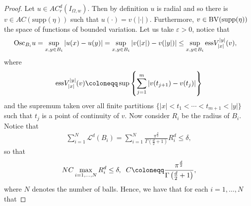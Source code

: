 \documentclass[11pt,leqno]{amsart}
\theoremstyle{remark}
\theoremstyle{definition}
\theoremstyle{definition}
\newcommand{\supp}{\mathrm{supp}}
\begin{document}
\begin{proof}
Let $u\in AC_{r}^{d}(I_{\Omega,w})$. Then by definition $u$ is radial and so there is $v\in AC({\supp(\eta)})$ such that $u(\cdot)=v(\vert \cdot\vert)$.   Furthermore, $v\in {\rm BV}({\supp(\eta)})$ the space of functions of bounded variation. Let us take $\varepsilon>0$, notice that
\begin{align}\label{mkmk}
{\rm Osc}_{B_{i}}u=\sup_{x,y\in B_{i}}\vert u(x)-u(y) \vert&=\sup_{x,y\in B_{i}}\vert v(\vert x\vert)-v(\vert y\vert) \vert
\leq \sup_{x,y\in B_{i}}{\rm ess} V_{\vert x\vert}^{\vert y\vert}(v),
\end{align}
where 
\begin{align*}
{\rm ess} V_{\vert x\vert}^{\vert y\vert}(v)\coloneqq \sup\left\{\sum_{j=1}^{m}\vert v(t_{j+1})-v(t_{j})\vert\right\}
\end{align*}
and the supremum taken over all finite partitions $\{|x|<t_{1}<\cdots <t_{m+1}< |y|\}$ such that $t_{j}$ is a point of continuity of $v$. Now consider $R_{i}$ be the radius of $B_{i}$.  Notice that 
\begin{align*}
\sum_{i=1}^{N}\mathcal{L}^{d}(B_{i})=\sum_{i=1}^{N}\frac{\pi^{\frac{d}{2}}}{\Gamma\left(\frac{d}{2}+1\right)}R_{i}^d \leq \delta,
\end{align*}
so that 
\begin{align*}
NC\max _{i=1,\ldots, N}R_{i}^{d} \leq \delta, \hskip 0,2cm C\coloneqq \frac{\pi^{\frac{d}{2}}}{\Gamma\left(\frac{d}{2}+1\right)},
\end{align*}
where $N$ denotes the number of balls.  Hence, we have that for each $i=1,\ldots,N$ that


\end{proof}
\end{document}
